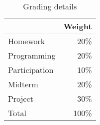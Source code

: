 \documentclass[11pt]{article}
\begin{document}
\begin{table}[htb]
  \centering
  \begin{tabular}{lr}
    \toprule
                  & Weight \\
    \midrule
    Homework      & 20\%   \\
    Programming   & 20\%   \\
    Participation & 10\%   \\
    Midterm       & 20\%   \\
    Project       & 30\%   \\
    \midrule
    Total         & 100\%  \\
    \bottomrule
  \end{tabular}
  \caption{Grading details}
  \label{tab:grading}
\end{table}
\begin{comment}
#+ORGTBL: SEND grades orgtbl-to-latex :splice nil :skip 0 :booktabs t
|               | Weight |
|               |    <r> |
|---------------+--------|
| Homework      |    20%
| Programming   |    20%
| Participation |    10%
| Midterm       |    20%
| Project       |    30%
|---------------+--------|
| Total         |   100%
#+TBLFM: @11$2=100*vsum(@I..II);%
\end{comment}



\lastupdated

\end{document}
